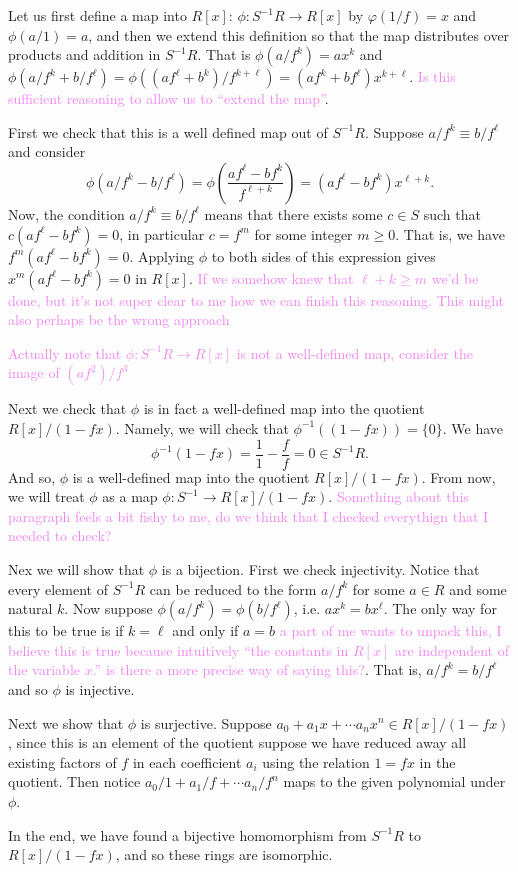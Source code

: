 \documentclass[12pt,letterpaper,boxed]{hmcpset}
\newcommand{\wg}[1]{\textcolor{violet}{#1}}
\newcommand{\inv}{^{-1}}
\begin{document}
\begin{solution}
Let us first define a map into $R[x]$: $\phi: S\inv R \to R[x]$ by 
$\varphi(1/f) = x$ and $\phi(a/1) = a$, and then we extend this
definition so that the map distributes over products and addition in
$S\inv R$. That is $\phi(a/f^k) = ax^k$ and $\phi(a/f^k + b/f^\ell) =
\phi((af^\ell + b^k)/f^{k+\ell}) = (af^k + bf^\ell)x^{k+\ell}$. 
\wg{Is this sufficient reasoning to allow us to ``extend the map''}.

First we check that this is a well defined map out of $S\inv R$. 
Suppose $a/f^k \equiv b/f^\ell$ and consider
\[
	\phi(a/f^k - b/f^\ell) = \phi(\frac{af^\ell - bf^k}{f^{\ell+k}})
		= (af^\ell - bf^k)x^{\ell+k}.
\]
Now, the condition $a/f^k \equiv b/f^\ell$ means that there exists
some $c \in S$ such that $c(af^\ell - bf^k) = 0$, in particular $c =
f^m$ for some integer $m \geq 0$. That is, we have $f^m(af^\ell -
bf^k) = 0$. Applying $\phi$ to both sides of this expression gives
$x^m(af^\ell - bf^k) = 0$ in $R[x]$. \wg{If we somehow knew that $\ell
+ k \geq m$ we'd be done, but it's not super clear to me how we can
finish this reasoning. This might also perhaps be the wrong approach}

\wg{Actually note that $\phi: S\inv R \to R[x]$ is not a well-defined
map, consider the image of $(af^2)/f^3$}

Next we check that $\phi$ is in fact a well-defined map into the
quotient $R[x]/(1-fx)$. Namely, we will check that $\phi\inv((1-fx)) =
\{0\}$. We have \[
	\phi\inv(1-fx) = \frac{1}{1} - \frac{f}{f} = 0 \in S\inv R. 
\]
And so, $\phi$ is a well-defined map into the quotient $R[x]/(1-fx)$.
From now, we will treat $\phi$ as a map $\phi: S\inv \to R[x]/(1-fx)$.
\wg{Something about this paragraph feels a bit fishy to me, do we
think that I checked everythign that I needed to check?}

Nex we will show that $\phi$ is a bijection. First we check
injectivity. Notice that every element of $S\inv R$ can be reduced to
the form $a/f^k$ for some $a \in R$ and some natural $k$. Now suppose
$\phi(a/f^k) = \phi(b/f^\ell)$, i.e. $ax^k = bx^\ell$. The only way
for this to be true is if $k = \ell$ and only if $a = b$ \wg{a part of
me wants to unpack this, I believe this is true because intuitively
``the constants in $R[x]$ are independent of the variable $x$.'' is
there a more precise way of saying this?}.
That is, $a/f^k = b/f^\ell$ and so $\phi$ is injective.

Next we show that $\phi$ is surjective. Suppose
$a_0 + a_1x + \cdots a_nx^n \in R[x]/(1-fx)$, since this is an element
of the quotient suppose we have reduced away all existing factors of
$f$ in each coefficient $a_i$ using the relation $1 = fx$ in the
quotient.
Then notice $a_0/1 +
a_1/f + \cdots a_n/f^n$ maps to the given polynomial under $\phi$.

In the end, we have found a bijective homomorphism from $S\inv R$ to
$R[x]/(1-fx)$, and so these rings are isomorphic. 
\end{solution}
\end{document}
